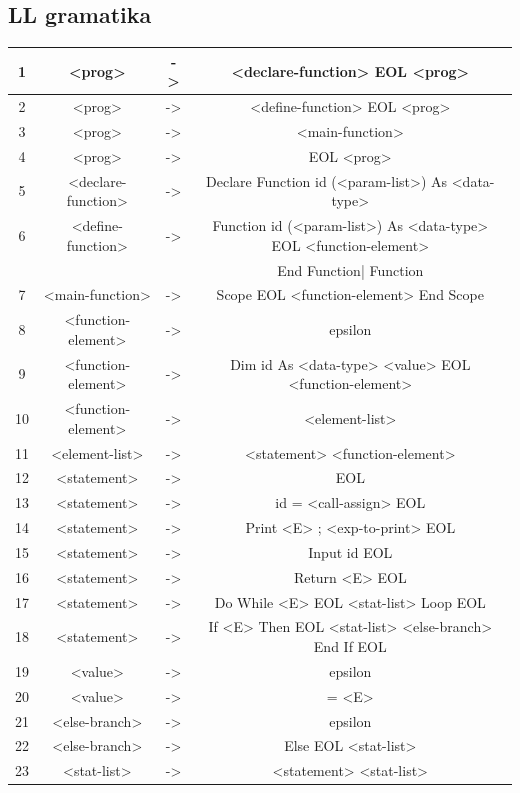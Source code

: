 \documentclass[11pt,a4paper]{article}
\begin{document}
	\subsection{LL gramatika}
	\begin{center}
	\begin{tabular}{|c||c|c|c|}
	\hline
	1&<prog> &->& <declare-function> EOL <prog>\\
	\hline
	2&<prog> &->& <define-function> EOL <prog>\\
	\hline
	3&<prog> &->& <main-function>\\
	\hline
	4&<prog> &->& EOL <prog>\\
	\hline
	5&<declare-function> &->& Declare Function id (<param-list>) As <data-type>\\
	\hline
	6&<define-function> &->& Function id (<param-list>) As <data-type> EOL <function-element> \\
	&&&End Function| Function\\
	\hline
	7&<main-function> &->& Scope EOL <function-element> End Scope\\
	\hline
	8&<function-element> &->& epsilon\\
	\hline
	9&<function-element> &->& Dim id As <data-type> <value> EOL <function-element>\\
	\hline
	10&<function-element> &->& <element-list>\\
	\hline
	11&<element-list> &->& <statement> <function-element>\\
	\hline
	12&<statement> &->& EOL\\
	\hline
	13&<statement> &->& id = <call-assign> EOL\\
	\hline
	14&<statement> &->& Print <E> ; <exp-to-print> EOL\\
	\hline
	15&<statement> &->& Input id EOL\\
	\hline
	16&<statement> &->& Return <E> EOL\\
	\hline
	17&<statement> &->& Do While <E> EOL <stat-list> Loop EOL\\
	\hline
	18&<statement> &->& If <E> Then EOL <stat-list> <else-branch> End If EOL\\
	\hline
	19&<value> &->& epsilon\\
	\hline
	20&<value> &->& = <E>\\
	\hline
	21&<else-branch> &->& epsilon\\
	\hline
	22&<else-branch> &->& Else EOL <stat-list>\\
	\hline
	23&<stat-list> &->& <statement> <stat-list>\\

\end{tabular}
\end{center}
\end{document}
